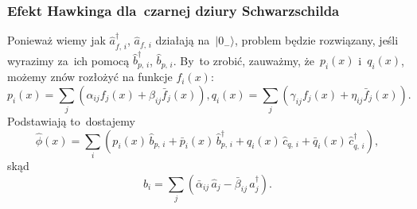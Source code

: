 \documentclass{beamer}  %
\begin{document}
\begin{frame}
  \frametitle{Efekt Hawkinga dla~czarnej dziury Schwarzschilda}

  \begin{block}{} %
    Ponieważ wiemy jak $\widehat{ a }_{ f,\, i }^{ \dagger }$,
    $\widehat{ a }_{ f,\, i }$ działają na~$| 0_{ - } \rangle$,
    problem będzie rozwiązany, jeśli wyrazimy za~ich pomocą
    $\widehat{ b }_{ p,\, i }^{ \dagger }$,
    $\widehat{ b }_{ p,\, i }$. By~to zrobić, zauważmy,
    że~$p_{ i }( x )$ i~$q_{ i }( x )$, możemy znów rozłożyć na
    funkcje $f_{ i }( x )$:
    \begin{subequations}
      \begin{equation}
        \label{eq:HawkingPromieniowanie-20a}
        p_{ i }( x )
        = \sum_{ j }( \alpha_{ i j } f_{ j }( x ) + \beta_{ i j }
        \bar{ f }_{ j }( x ) ),
      \end{equation}
      \begin{equation}
        \label{eq:HawkingPromieniowanie-20b}
        q_{ i }( x ) = \sum_{ j }( \gamma_{ i j } f_{ j }( x )
        + \eta_{ i j } \bar{ f }_{ j }( x ) ).
      \end{equation}
    \end{subequations}
    Podstawiają to~dostajemy
    \begin{equation}
      \label{eq:HawkingPromieniowanie-21}
      \widehat{ \phi }( x )
      = \sum_{ i }( p_{ i }( x )\, \widehat{ b }_{ p,\, i }
      + \bar{ p }_{ i }( x )\, \widehat{ b }^{ \dagger }_{ p,\, i }
      + q_{ i }( x )\, \widehat{ c }_{ q,\, i }
      + \bar{ q }_{ i }( x )\, \widehat{ c }^{ \dagger }_{ q,\, i } ),
    \end{equation}
    skąd
    \begin{subequations}
      \begin{equation}
        \label{eq:HawkingPromieniowanie-22}
        \widehat{ b }_{ i } = \sum_{ j }( \bar{ \alpha }_{ i j }\,
        \widehat{ a }_{ j } - \bar{ \beta }_{ i j }\,
        \widehat{ a }^{ \dagger }_{ j } ).
      \end{equation}
    \end{subequations}
  \end{block}

\end{frame}
\end{document}
